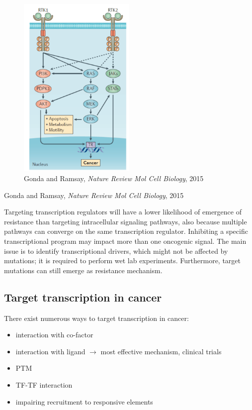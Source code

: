 \begin{figure}
\centering
\includegraphics[width=0.5\textwidth]{../_resources/Screen_Shot_2022-11-04_at_11-51-12.png}
\caption{Gonda and Ramsay, \emph{Nature Review Mol Cell Biology}, 2015}
\end{figure}

Gonda and Ramsay, \emph{Nature Review Mol Cell Biology}, 2015

Targeting transcription regulators will have a lower likelihood of emergence of resistance than targeting intracellular signaling pathways, also because multiple pathways can converge on the same transcription regulator. Inhibiting a specific transcriptional program may impact more than one oncogenic signal. The main issue is to identify transcriptional drivers, which might not be affected by mutations; it is required to perform wet lab experiments. Furthermore, target mutations can still emerge as resistance mechanism.

\hypertarget{target-transcription-in-cancer}{%
\subsection{Target transcription in cancer}\label{target-transcription-in-cancer}}

There exist numerous ways to target transcription in cancer:

\begin{itemize}
\tightlist
\item
  interaction with co-factor
\item
  interaction with ligand $\rightarrow$ most effective mechanism, clinical trials
\item
  PTM
\item
  TF-TF interaction
\item
  impairing recruitment to responsive elements
\end{itemize}

